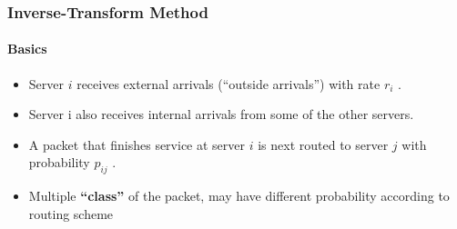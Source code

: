 \documentclass{beamer}
\begin{document}
\begin{frame}
    \frametitle{Inverse-Transform Method}
    \framesubtitle{Basics}
	\begin{itemize}
		\item Server $i$ receives external arrivals (“outside arrivals”) with rate $r_i$ .
		\item Server i also receives internal arrivals from some of the other servers. 
		\item A packet that finishes service at server $i$ is next routed to server $j$ with 							probability $p_{ij}$ . 
		\item Multiple \textbf{“class”} of the packet, may have different probability according to 			routing scheme
		  
	\end{itemize}	    
    
\end{frame}


    
\end{document}
